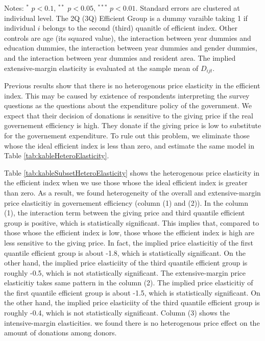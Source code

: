 \documentclass[ review  , 3p ]{elsarticle}
\begin{document}
\begin{table}
\begin{threeparttable}
  \begin{tablenotes}
  \item Notes: $^{*}$ $p < 0.1$, $^{**}$ $p < 0.05$, $^{***}$ $p < 0.01$. Standard errors are clustered at individual level. The 2Q (3Q) Efficient Group is a dummy varaible taking 1 if individual $i$ belongs to the second (third) quanitle of efficient index. Other controls are age (its squared value), the interaction between year dummies and education dummies, the interaction between year dummies and gender dummies, and the interaction between year dummies and resident area. The implied extensive-margin elasticity is evaluated at the sample mean of $D_{ijt}$.
  \end{tablenotes}
  \end{threeparttable}
  \end{table}

  Previous results show that there is no heterogenous price elasticity in the efficient index.
  This may be caused by existence of respondents
  interpreting the survey questions as the questions about the expenditure policy of the government.
  We expect that their decision of donations is sensitive to the giving price
  if the real governement efficiency is high.
  They donate if the giving price is low to substitute for the governement expenditure.
  To rule out this problem, we eliminate those whose the ideal efficient index is less than zero,
  and estimate the same model in Table \ref{tab:kableHeteroElasticity}.

  Table \ref{tab:kableSubsetHeteroElasticity} shows the heterogenous price elasticity in the efficient index
  when we use those whose the ideal efficient index is greater than zero.
  As a result, we found heterogeneity of the overall and extensive-margin price elasticitiy
  in governement efficiency (column (1) and (2)).
  In the column (1), the interaction term between the giving price and third quantile efficient group
  is positive, which is statistically significant.
  This implies that, compared to those whose the efficient index is low,
  those whose the efficient index is high are less sensitive to the giving price.
  In fact, the implied price elasticitiy of the first quantile efficient group is about -1.8,
  which is statistically significant.
  On the other hand, the implied price elasticiity of the third quantile efficient group is roughly -0.5,
  which is not statistically significant.
  The extensive-margin price elasticitiy takes same pattern in the column (2).
  The implied price elasticitiy of the first quantile efficient group is about -1.5,
  which is statistically significant.
  On the other hand, the implied price elasticiity of the third quantile efficient group is roughly -0.4,
  which is not statistically significant.
  Column (3) shows the intensive-margin elasticities.
  we found there is no heterogenous price effect on the amount of donations among donors.
\end{document}
